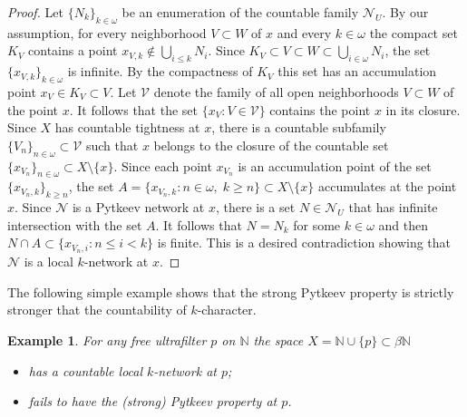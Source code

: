 \documentclass{amsart}
\newtheorem{example}[theorem]{Example}
\theoremstyle{definition}
\begin{document}
\begin{proof}
 Let $\{N_k\}_{k\in{\omega}}$ be an enumeration of the countable family $\mathcal N_U$.
 By our assumption, for every neighborhood $V\subset W$ of $x$ and every $k\in{\omega}$ the compact set $K_V$ contains a point $x_{V,k}\notin \bigcup_{i\le k}{N_i}$. Since $K_V\subset V\subset W\subset\bigcup_{i\in{\omega}}N_i$, the set $\{x_{V,k}\}_{k\in{\omega}}$ is infinite. By the compactness of $K_V$ this set has an accumulation point $x_V\in K_V\subset V$. Let $\mathcal V$ denote the family of all open neighborhoods $V\subset W$ of the point $x$. It follows that the set $\{x_V:V\in\mathcal V\}$ contains the point $x$ in its closure. Since $X$ has countable tightness at $x$, there is a countable subfamily $\{V_n\}_{n\in{\omega}}\subset\mathcal V$ such that $x$ belongs to the closure of the countable set $\{x_{V_n}\}_{n\in{\omega}}\subset X\setminus \{x\}$. Since each point $x_{V_n}$ is an accumulation point of the set $\{x_{V_n,k}\}_{k\ge n}$, the set $A=\{x_{V_n,k}:n\in{\omega},\;k\ge n\}\subset X\setminus\{x\}$ accumulates at the point $x$. Since $\mathcal N$ is a Pytkeev network at $x$, there is a set $N\in\mathcal N_U$ that has infinite intersection with the set $A$. It follows that $N=N_k$ for some $k\in{\omega}$ and then $N\cap A\subset \{x_{V_n,i}:n\le i<k\}$ is finite. This is a desired contradiction showing that $\mathcal N$ is a local $k$-network at $x$.
\end{proof}

The following simple example shows that the strong Pytkeev property is strictly stronger that the countability of $k$-character.

\begin{example} For any free ultrafilter $p$ on ${\mathbb N}$ the space $X={\mathbb N}\cup\{p\}\subset\beta{\mathbb N}$
\begin{itemize}
\item has a countable local $k$-network at $p$;
\item fails to have the (strong) Pytkeev property at $p$.
\end{itemize}
\end{example}
\end{document}
